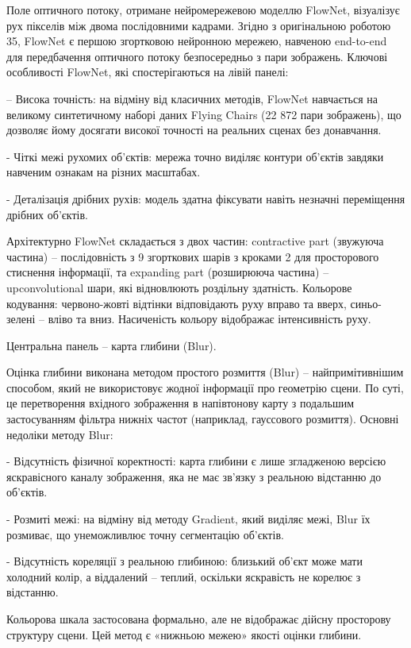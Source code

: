 \documentclass[
]{article}
\begin{document}
Поле оптичного потоку, отримане нейромережевою моделлю FlowNet, візуалізує рух пікселів між двома послідовними кадрами. Згідно з оригінальною роботою 35, FlowNet є першою згортковою нейронною мережею, навченою end-to-end для передбачення оптичного потоку безпосередньо з пари зображень. Ключові особливості FlowNet, які спостерігаються на лівій панелі:

-- Висока точність: на відміну від класичних методів, FlowNet навчається на великому синтетичному наборі даних Flying Chairs (22 872 пари зображень), що дозволяє йому досягати високої точності на реальних сценах без донавчання.

- Чіткі межі рухомих об'єктів: мережа точно виділяє контури об'єктів завдяки навченим ознакам на різних масштабах.

- Деталізація дрібних рухів: модель здатна фіксувати навіть незначні переміщення дрібних об'єктів.

Архітектурно FlowNet складається з двох частин: contractive part (звужуюча частина) -- послідовність з 9 згорткових шарів з кроками 2 для просторового стиснення інформації, та expanding part (розширююча частина) -- upconvolutional шари, які відновлюють роздільну здатність. Кольорове кодування: червоно-жовті відтінки відповідають руху вправо та вверх, синьо-зелені -- вліво та вниз. Насиченість кольору відображає інтенсивність руху.

Центральна панель -- карта глибини (Blur).

Оцінка глибини виконана методом простого розмиття (Blur) -- найпримітивнішим способом, який не використовує жодної інформації про геометрію сцени. По суті, це перетворення вхідного зображення в напівтонову карту з подальшим застосуванням фільтра нижніх частот (наприклад, гауссового розмиття). Основні недоліки методу Blur:

- Відсутність фізичної коректності: карта глибини є лише згладженою версією яскравісного каналу зображення, яка не має зв'язку з реальною відстанню до об'єктів.

- Розмиті межі: на відміну від методу Gradient, який виділяє межі, Blur їх розмиває, що унеможливлює точну сегментацію об'єктів.

- Відсутність кореляції з реальною глибиною: близький об'єкт може мати холодний колір, а віддалений -- теплий, оскільки яскравість не корелює з відстанню.

Кольорова шкала застосована формально, але не відображає дійсну просторову структуру сцени. Цей метод є «нижньою межею» якості оцінки глибини.
\end{document}
